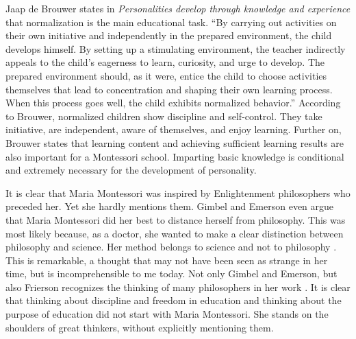\documentclass[12pt, a4paper]{article}
\begin{document}
Jaap de Brouwer states in \emph{Personalities develop through knowledge and experience} \cite{Brouwer2021} that normalization is the main educational task. “By carrying out activities on their own initiative and independently in the prepared environment, the child develops himself. By setting up a stimulating environment, the teacher indirectly appeals to the child’s eagerness to learn, curiosity, and urge to develop. The prepared environment should, as it were, entice the child to choose activities themselves that lead to concentration and shaping their own learning process. When this process goes well, the child exhibits normalized behavior.” \cite[p.60]{Brouwer2021} According to Brouwer, normalized children show discipline and self-control. They take initiative, are independent, aware of themselves, and enjoy learning. Further on, Brouwer states that learning content and achieving sufficient learning results are also important for a Montessori school. Imparting basic knowledge is conditional and extremely necessary for the development of personality.

It is clear that Maria Montessori was inspired by Enlightenment philosophers who preceded her. Yet she hardly mentions them. Gimbel and Emerson even argue that Maria Montessori did her best to distance herself from philosophy. This was most likely because, as a doctor, she wanted to make a clear distinction between philosophy and science. Her method belongs to science and not to philosophy \cite[]{Gimbel}. This is remarkable, a thought that may not have been seen as strange in her time, but is incomprehensible to me today. Not only Gimbel and Emerson, but also Frierson recognizes the thinking of many philosophers in her work \cite[]{Frierson}. It is clear that thinking about discipline and freedom in education and thinking about the purpose of education did not start with Maria Montessori. She stands on the shoulders of great thinkers, without explicitly mentioning them.
\end{document}
